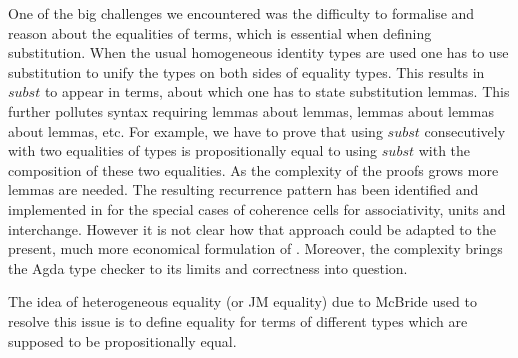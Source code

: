 One of the big challenges we encountered was the difficulty to
formalise and reason about the equalities of terms, which is
essential when defining substitution. When the usual homogeneous identity types
are used one has to use substitution to unify
the types on both sides of equality types. This results in
$\mathit{subst}$ to appear in terms, about which one has to state
substitution lemmas. This further pollutes syntax requiring lemmas
about lemmas, lemmas about lemmas about lemmas, etc. For example, we
have to prove that using $\mathit{subst}$ consecutively with two equalities
of types is propositionally equal to using $\mathit{subst}$ with the
composition of these two equalities. As the complexity of the proofs
grows more lemmas are needed. The resulting
recurrence pattern has been identified and implemented in
\cite{txa:csl} for the special cases of coherence cells for
associativity, units and interchange. However it is not clear how that
approach could be adapted to the present, much more economical
formulation of {\wog}. Moreover, the complexity brings the
Agda type checker to its limits and correctness into question.

The idea of heterogeneous equality (or JM equality) due to McBride
\cite{mcbride:elimination} used to resolve this issue is to define
equality for terms of different types which are supposed to be propositionally equal.


\begin{code}\>\<%
\\
\>  \AgdaSymbol{\{} \AgdaSymbol{:} \AgdaSymbol{\}\{} \AgdaSymbol{:}  \AgdaSymbol{\}} \AgdaSymbol{:}\<%
\\
\>[2]\<[9]%
\>[9]\AgdaSymbol{\{} \AgdaSymbol{:}  \AgdaSymbol{\}}         \<%
\\
\>[0]\<[2]%
\>[2] \AgdaSymbol{:} \AgdaSymbol{(} \AgdaSymbol{:}  \AgdaSymbol{)}    \<%
\\
\>\<\end{code}

